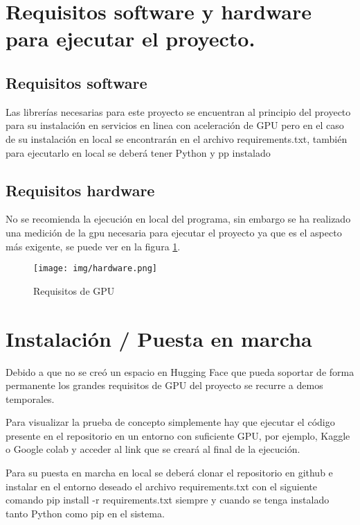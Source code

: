 
\section{Requisitos software y hardware para ejecutar el proyecto.}

\subsection{Requisitos software}

Las librerías necesarias para este proyecto se encuentran al principio del proyecto para su instalación en servicios en linea con aceleración de GPU pero en el caso de su instalación en local se encontrarán en el archivo requirements.txt, también para ejecutarlo en local se deberá tener Python y pp instalado %

\subsection{Requisitos hardware}

No se recomienda la ejecución en local del programa, sin embargo se ha realizado una medición de la gpu necesaria para ejecutar el proyecto ya que es el aspecto más exigente, se puede ver en la figura \ref{fig:hardware}.


\begin{figure}[h!]
    \centering
    \texttt{[image: img/hardware.png]}
    \caption{Requisitos de GPU}
    \label{fig:hardware}
\end{figure}

\section{Instalación / Puesta en marcha}

Debido a que no se creó un espacio en Hugging Face que pueda soportar de forma permanente los grandes requisitos de GPU del proyecto se recurre a demos temporales.

Para visualizar la prueba de concepto simplemente hay que ejecutar el código presente en el repositorio en un entorno con suficiente GPU, por ejemplo, Kaggle o Google colab y acceder al link que se creará al final de la ejecución.

Para su puesta en marcha en local se deberá clonar el repositorio en github e instalar en el entorno deseado el archivo requirements.txt con el siguiente comando pip install -r requirements.txt siempre y cuando se tenga instalado tanto Python como pip en el sistema.


